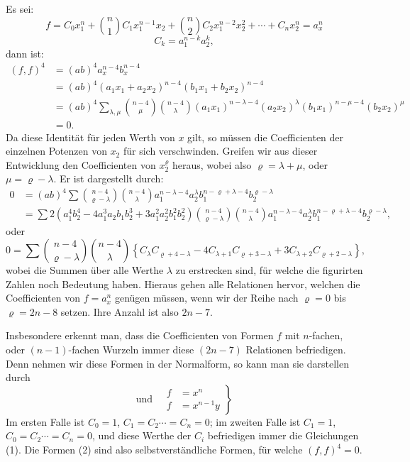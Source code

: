 \documentclass[11pt]{article}
\providecommand{\weq}[2]{\begin{equation}\tag{#1}#2\end{equation}}
\begin{document}
Es sei:
\[
f = C_0 x_1^n + \binom{n}{1} C_1 x_1^{n-1}x_2 + \binom{n}{2} C_2 x_1^{n-2}x_2^2 + \cdots + C_n x_2^n = a_x^n
\]
\[
C_k = a_1^{n-k}a_2^k,
\]
dann ist:
\[
\begin{aligned}
(f,f)^4 &= (ab)^4 a_x^{n-4}b_x^{n-4}\\
&= (ab)^4 (a_1x_1+a_2x_2)^{n-4}(b_1x_1+b_2x_2)^{n-4}\\
&= (ab)^4 \sum_{\lambda,\mu}\binom{n-4}{\mu}\binom{n-4}{\lambda}(a_1x_1)^{n-\lambda-4}(a_2x_2)^\lambda(b_1x_1)^{n-\mu-4}(b_2x_2)^\mu\\
&= 0.
\end{aligned}
\]
Da diese Identit\"at f\"ur jeden Werth von $x$ gilt, so m\"ussen die
Coefficienten der einzelnen Potenzen von $x_2$ f\"ur sich verschwinden.
Greifen wir aus dieser Entwicklung den Coefficienten von $x_2^\varrho$
heraus, wobei also $\varrho = \lambda + \mu$, oder $\mu = \varrho - \lambda$.
Er ist dargestellt durch:
\[
\begin{aligned}
0 &= (ab)^4 \sum \binom{n-4}{\varrho-\lambda}\binom{n-4}{\lambda} a_1^{n-\lambda-4}a_2^\lambda b_1^{n-\varrho+\lambda-4}b_2^{\varrho-\lambda}\\
&= \sum 2\left(a_1^4b_2^4 - 4a_1^3a_2b_1b_2^3 + 3a_1^2a_2^2b_1^2b_2^2\right)\binom{n-4}{\varrho-\lambda}\binom{n-4}{\lambda} a_1^{n-\lambda-4}a_2^\lambda b_1^{n-\varrho+\lambda-4}b_2^{\varrho-\lambda},
\end{aligned}
\]
oder
\weq{1}{0 = \sum \binom{n-4}{\varrho-\lambda}\binom{n-4}{\lambda}\left\{C_\lambda C_{\varrho+4-\lambda} - 4C_{\lambda+1}C_{\varrho+3-\lambda} + 3C_{\lambda+2}C_{\varrho+2-\lambda}\right\},}
wobei die Summen \"uber alle Werthe $\lambda$ zu erstrecken sind, f\"ur
welche die figurirten Zahlen noch Bedeutung haben. Hieraus gehen alle
Relationen hervor, welchen die Coefficienten von $f = a_x^n$ gen\"ugen
m\"ussen, wenn wir der Reihe nach $\varrho = 0$ bis $\varrho = 2n-8$ setzen.
Ihre Anzahl ist also $2n-7$.

Insbesondere erkennt man, dass die Coefficienten von Formen $f$ mit
$n$-fachen, oder $(n-1)$-fachen Wurzeln immer diese $(2n-7)$ Relationen
befriedigen. Denn nehmen wir diese Formen in der Normalform, so kann
man sie darstellen durch
\weq{2}{\text{und}\quad\left.\begin{aligned} f &= x^n\\ f &= x^{n-1}y\end{aligned}\right\}}
Im ersten Falle ist $C_0 = 1$, $C_1 = C_2 \cdots = C_n = 0$;
im zweiten Falle ist $C_1 = 1$, $C_0 = C_2 \cdots = C_n = 0$,
und diese Werthe der $C_i$ befriedigen immer die Gleichungen (1). Die
Formen (2) sind also selbstverst\"andliche Formen, f\"ur welche
$(f,f)^4 = 0$.
\end{document}
